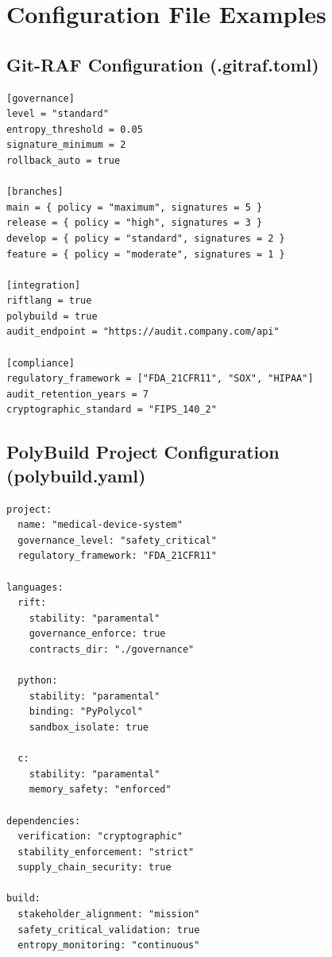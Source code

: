 \documentclass[11pt,letterpaper]{article}
\begin{document}
\section{Configuration File Examples}

\subsection{Git-RAF Configuration (.gitraf.toml)}

\begin{lstlisting}[language=shell, caption=Git-RAF Configuration File]
[governance]
level = "standard"
entropy_threshold = 0.05
signature_minimum = 2
rollback_auto = true

[branches]
main = { policy = "maximum", signatures = 5 }
release = { policy = "high", signatures = 3 }
develop = { policy = "standard", signatures = 2 }
feature = { policy = "moderate", signatures = 1 }

[integration]
riftlang = true
polybuild = true
audit_endpoint = "https://audit.company.com/api"

[compliance]
regulatory_framework = ["FDA_21CFR11", "SOX", "HIPAA"]
audit_retention_years = 7
cryptographic_standard = "FIPS_140_2"
\end{lstlisting}

\subsection{PolyBuild Project Configuration (polybuild.yaml)}

\begin{lstlisting}[language=shell, caption=PolyBuild Configuration File]
project:
  name: "medical-device-system"
  governance_level: "safety_critical"
  regulatory_framework: "FDA_21CFR11"

languages:
  rift:
    stability: "paramental"
    governance_enforce: true
    contracts_dir: "./governance"
    
  python:
    stability: "paramental"
    binding: "PyPolycol"
    sandbox_isolate: true
    
  c:
    stability: "paramental"
    memory_safety: "enforced"
    
dependencies:
  verification: "cryptographic"
  stability_enforcement: "strict"
  supply_chain_security: true
  
build:
  stakeholder_alignment: "mission"
  safety_critical_validation: true
  entropy_monitoring: "continuous"
\end{lstlisting}
\end{document}
